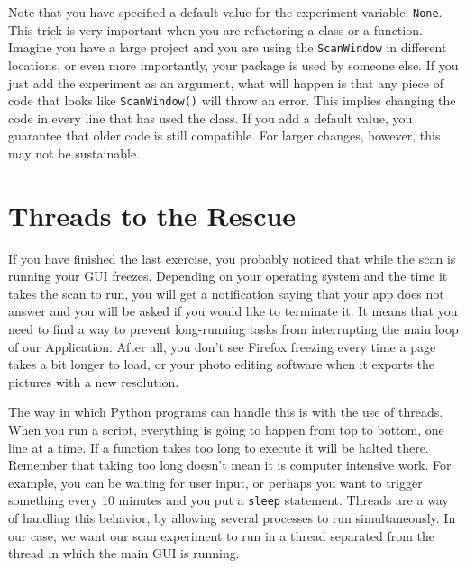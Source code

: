 Note that you have specified a default value for the experiment
variable: \texttt{None}. This trick is very important when you are
refactoring a class or a function. Imagine you have a large project and
you are using the \texttt{ScanWindow} in different locations, or even
more importantly, your package is used by someone else. If you just add
the experiment as an argument, what will happen is that any piece of
code that looks like \texttt{ScanWindow()} will throw an error. This
implies changing the code in every line that has used the class. If you
add a default value, you guarantee that older code is still compatible.
For larger changes, however, this may not be sustainable.





\section{Threads to the Rescue}\label{threads-to-therescue}
If you have finished the last exercise, you probably noticed that while
the scan is running your {GUI} freezes. Depending on your operating
system and the time it takes the scan to run, you will get a
notification saying that your app does not answer and you will be asked
if you would like to terminate it. It means that you need to find a way
to prevent long-running tasks from interrupting the main loop of our
Application. After all, you don't see Firefox freezing every time a page
takes a bit longer to load, or your photo editing software when it
exports the pictures with a new resolution.

The way in which Python programs can handle this is with the use of
threads. When you run a script, everything is going to happen from top
to bottom, one line at a time. If a function takes too long to execute
it will be halted there. Remember that taking too long doesn't mean it
is computer intensive work. For example, you can be waiting for user
input, or perhaps you want to trigger something every 10 minutes and you
put a \texttt{sleep} statement. Threads are a way of handling this
behavior, by allowing several processes to run simultaneously. In our
case, we want our scan experiment to run in a thread separated from the
thread in which the main {GUI} is running.

